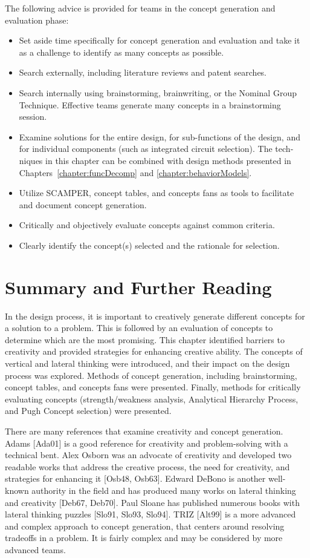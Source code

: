 The following advice is provided for teams in the concept generation and
evaluation phase:

\begin{itemize}
\item
  Set aside time specifically for concept generation and evaluation and
  take it as a challenge to identify as many concepts as possible.
\item
  Search externally, including literature reviews and patent searches.
\item
  Search internally using brainstorming, brainwriting, or the Nominal
  Group Technique. Effective teams generate many concepts in a
  brainstorming session.
\item
  Examine solutions for the entire design, for sub-functions of the
  design, and for individual components (such as integrated circuit
  selection). The tech­niques in this chapter can be combined with design
  methods presented in 
  Chapters~\ref{chapter:funcDecomp}  and \ref{chapter:behaviorModels}.
\item
  Utilize SCAMPER, concept tables, and concepts fans as tools to
  facilitate and document concept generation.
\item
  Critically and objectively evaluate concepts against common criteria.
\item
  Clearly identify the concept(s) selected and the rationale for
  selection.
\end{itemize}

\section{Summary and Further Reading}
\label{section:conceptGenSummary-and-further-reading}

In the design process, it is important to creatively generate different
concepts for a solution to a problem. This is followed by an evaluation
of concepts to determine which are the most promising. This chapter
identified barriers to creativity and provided strategies for enhancing
creative ability. The concepts of vertical and lateral thinking were
introduced, and their im­pact on the design process was explored. Methods
of concept generation, including brainstorming, concept tables, and
concepts fans were presented. Finally, methods for critically evaluating
concepts (strength/weakness analysis, Analytical Hierarchy Process, and
Pugh Concept selection) were presented.

There are many references that examine creativity and concept
generation. Adams {[}Ada01{]} is a good reference for creativity and
problem-solving with a technical bent. Alex Os­born was an advocate of
creativity and developed two readable works that address the creative
process, the need for creativity, and strategies for enhancing it
{[}Osb48, Osb63{]}. Ed­ward DeBono is another well-known authority in the
field and has produced many works on lateral thinking and creativity
{[}Deb67, Deb70{]}. Paul Sloane has published numerous books with
lateral thinking puzzles {[}Slo91, Slo93, Slo94{]}. TRIZ {[}Alt99{]} is
a more advanced and complex approach to concept generation, that centers
around resolving tradeoffs in a problem. It is fairly complex and may be
considered by more advanced teams.
